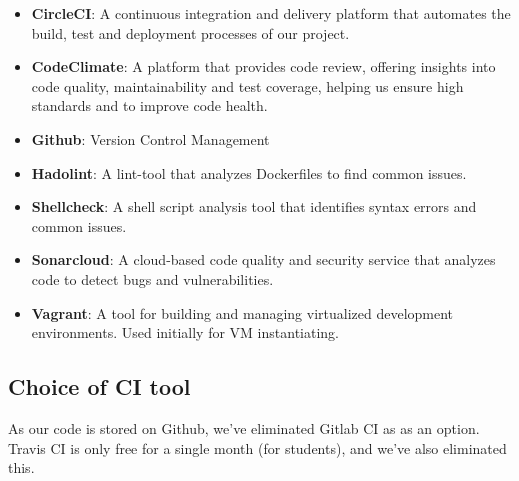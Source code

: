 \begin{multicols}{2}
\begin{itemize}
        \item \textbf{CircleCI}: A continuous integration and delivery platform that automates the build, test and deployment processes of our project. 
        \item \textbf{CodeClimate}: A platform that provides code review, offering insights into code quality, maintainability and test coverage, helping us ensure high standards and to improve code health.
        \item \textbf{Github}: Version Control Management
        \item \textbf{Hadolint}: A lint-tool that analyzes Dockerfiles to find common issues.
        \item \textbf{Shellcheck}: A shell script analysis tool that identifies syntax errors and common issues.
        \item \textbf{Sonarcloud}: A cloud-based code quality and security service that analyzes code to detect bugs and vulnerabilities.
        \item \textbf{Vagrant}: A tool for building and managing virtualized development environments. Used initially for VM instantiating.
    \end{itemize}
\end{multicols}

\newpage
\subsection{Choice of CI tool}
\label{app:ci_tool_choice}
As our code is stored on Github, we've eliminated Gitlab CI as as an option. Travis CI is only free for a single month (for students), and we've also eliminated this.

